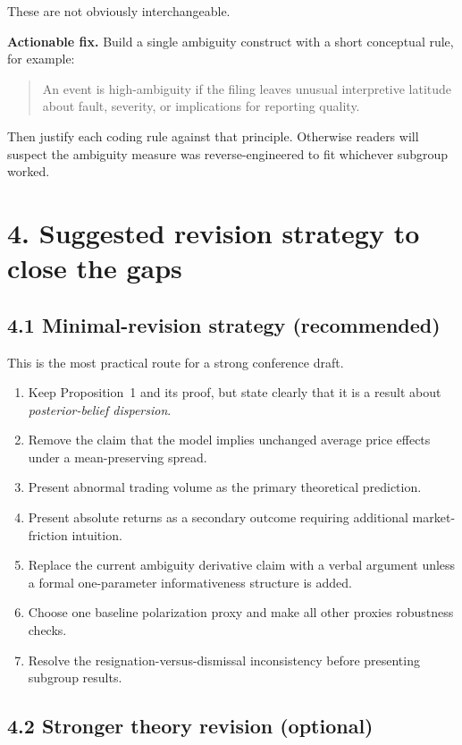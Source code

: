 \documentclass[11pt]{article}
\begin{document}
These are not obviously interchangeable.

\textbf{Actionable fix.} Build a single ambiguity construct with a short conceptual rule, for example:

\begin{quote}
An event is high-ambiguity if the filing leaves unusual interpretive latitude about fault, severity, or implications for reporting quality.
\end{quote}

Then justify each coding rule against that principle. Otherwise readers will suspect the ambiguity measure was reverse-engineered to fit whichever subgroup worked.

\section*{4. Suggested revision strategy to close the gaps}

\subsection*{4.1 Minimal-revision strategy (recommended)}

This is the most practical route for a strong conference draft.

\begin{enumerate}[leftmargin=1.5em]
    \item Keep Proposition~1 and its proof, but state clearly that it is a result about \emph{posterior-belief dispersion}.
    \item Remove the claim that the model implies unchanged average price effects under a mean-preserving spread.
    \item Present abnormal trading volume as the primary theoretical prediction.
    \item Present absolute returns as a secondary outcome requiring additional market-friction intuition.
    \item Replace the current ambiguity derivative claim with a verbal argument unless a formal one-parameter informativeness structure is added.
    \item Choose one baseline polarization proxy and make all other proxies robustness checks.
    \item Resolve the resignation-versus-dismissal inconsistency before presenting subgroup results.
\end{enumerate}

\subsection*{4.2 Stronger theory revision (optional)}
\end{document}
